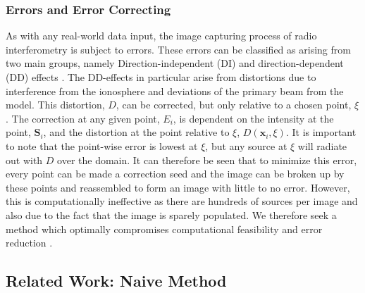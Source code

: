 \subsubsection{Errors and Error Correcting}\label{ra:ssec:eec}
As with any real-world data input, the image capturing process of radio interferometry is subject to errors. These errors can be classified as arising from two main groups, namely Direction-independent (DI) and direction-dependent (DD) effects \citep{smirnov2015radio}. The DD-effects in particular arise from distortions due to interference from the ionosphere and deviations of the primary beam from the model. This distortion, $D$, can be corrected, but only relative to a chosen point, $\xi$. The correction at any given point, $E_i$, is dependent on the intensity at the point, $\boldsymbol{S}_i$, and the distortion at the point relative to $\xi$, $D(\boldsymbol{x}_i,\xi)$. It is important to note that the point-wise error is lowest at $\xi$, but any source at $\xi$ will radiate out with $D$ over the domain. It can therefore be seen that to minimize this error, every point can be made a correction seed and the image can be broken up by these points and reassembled to form an image with little to no error. However, this is computationally ineffective as there are hundreds of sources per image and also due to the fact that the image is sparely populated. We therefore seek a method which optimally compromises computational feasibility and error reduction \citep{oleg}.
\subsection{Related Work: Naive Method}




